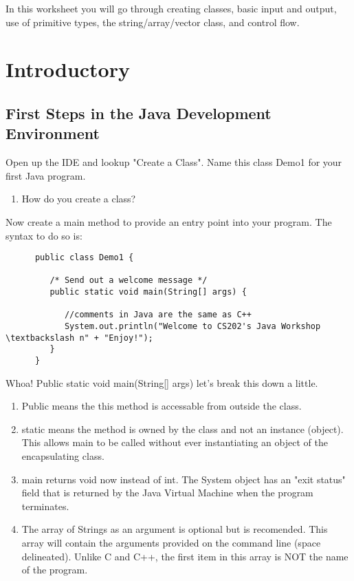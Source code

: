 \documentclass{article}
\begin{document}
In this worksheet you will go through creating classes, basic input and output, use of primitive types, the string/array/vector class, and control flow.
\section{Introductory}
\subsection{First Steps in the Java Development Environment}
\begin{steps}
   \item Open up the IDE and lookup "Create a Class". Name this class Demo1 for your first Java program.
   \begin{enumerate}[label=\Alph*.]
   \item How do you create a class?
   \end{enumerate} 
   \item Now create a main method to provide an entry point into your program. The syntax to do so is: \\
      \begin{verbatim}
      public class Demo1 {

         /* Send out a welcome message */
         public static void main(String[] args) {

            //comments in Java are the same as C++
            System.out.println("Welcome to CS202's Java Workshop \textbackslash n" + "Enjoy!");
         }
      }
\end{verbatim}
   Whoa! Public static void main(String[] args) let's break this down a little.
   \begin{enumerate}[label=\Alph*.]
   \item Public means the this method is accessable from outside the class.
   \item static means the method is owned by the class and not an instance (object). This allows main to be called without ever instantiating an object of the encapsulating class.
   \item main returns void now instead of int. The System object has an "exit status" field that is returned by the Java Virtual Machine when the program terminates.
   \item The array of Strings as an argument is optional but is recomended. This array will contain the arguments provided on the command line (space delineated). Unlike C and C++, the first item in this array is NOT the name of the program.
   \end{enumerate} 


\end{steps}
\end{document}
